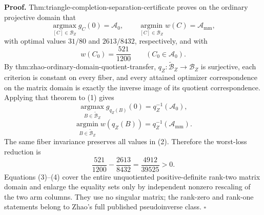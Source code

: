 \textbf{Proof.}
Thm:triangle-completion-separation-certificate proves on the ordinary projective domain that
\[
\operatorname*{argmax}_{[C]\in\mathcal B_Z}g_C(0)=\mathcal A_0,
\qquad
\operatorname*{argmin}_{[C]\in\mathcal B_Z}w(C)=\mathcal A_{\mathrm{mm}}, \tag{1}
\]
with optimal values \(31/80\) and \(2613/8432\), respectively, and with
\[
w(C_0)=\frac{521}{1200}
\qquad(C_0\in\mathcal A_0).                                      \tag{2}
\]
By thm:zhao-ordinary-domain-quotient-transfer, \(q_Z:\widetilde{\mathcal B}_Z\to\mathcal B_Z\) is surjective, each criterion is constant on every fiber, and every attained optimizer correspondence on the matrix domain is exactly the inverse image of its quotient correspondence.  Applying that theorem to (1) gives
\[
\operatorname*{argmax}_{B\in\widetilde{\mathcal B}_Z}g_{q_Z(B)}(0)
=q_Z^{-1}(\mathcal A_0),
\]
\[
\operatorname*{argmin}_{B\in\widetilde{\mathcal B}_Z}w(q_Z(B))
=q_Z^{-1}(\mathcal A_{\mathrm{mm}}).                              \tag{3}
\]
The same fiber invariance preserves all values in (2).  Therefore the worst-loss reduction is
\[
\frac{521}{1200}-\frac{2613}{8432}
=\frac{4912}{39525}>0.                                            \tag{4}
\]
Equations (3)--(4) cover the entire unquotiented positive-definite rank-two matrix domain and enlarge the equality sets only by independent nonzero rescaling of the two arm columns.  They use no singular matrix; the rank-zero and rank-one statements belong to Zhao's full published pseudoinverse class. \(\square\)